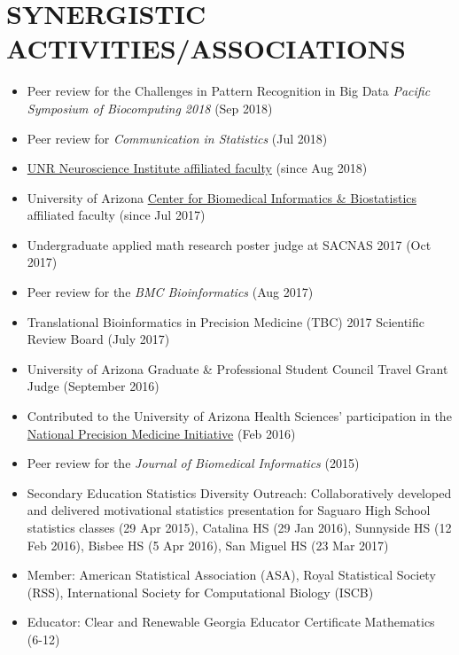 \documentclass[paper=a4,fontsize=11pt]{scrartcl} %
\newcommand{\NewPart}[2]{\section*{\uppercase{#1} #2 }}
\begin{document}
\NewPart{Synergistic Activities/Associations}{}
\vspace{-7pt}
\begin{itemize}[noitemsep]
  \item Peer review for the Challenges in Pattern Recognition in Big Data \emph{Pacific Symposium of Biocomputing 2018} (Sep 2018)
  \item Peer review for \emph{Communication in Statistics} (Jul 2018)
\item \href{https://www.unr.edu/neuroscience/people}{UNR Neuroscience Institute affiliated faculty} (since Aug 2018)
  \item University of Arizona \href{http://cb2.uahs.arizona.edu/}{Center for Biomedical Informatics \& Biostatistics} affiliated faculty (since Jul 2017)
\item Undergraduate applied math research poster judge at SACNAS 2017 (Oct 2017)
\item Peer review for the \emph{BMC Bioinformatics} (Aug 2017)
\item Translational Bioinformatics in Precision Medicine (TBC) 2017 Scientific Review Board (July 2017)
\item University of Arizona Graduate \& Professional Student Council Travel Grant Judge (September 2016)
\item Contributed to the University of Arizona Health Sciences' participation in the   \href{https://www.nih.gov/precision-medicine-initiative-cohort-program}{National Precision Medicine Initiative\circledR}  \hspace{3pt}(Feb 2016)
  \item Peer review for the \emph{Journal of Biomedical Informatics} (2015)
\item Secondary Education Statistics Diversity Outreach: Collaboratively developed and delivered motivational statistics presentation for Saguaro High School statistics classes (29 Apr 2015), Catalina HS (29 Jan 2016), Sunnyside HS (12 Feb 2016), Bisbee HS (5 Apr 2016), San Miguel HS (23 Mar 2017)
\item Member: American Statistical Association (ASA), Royal Statistical Society (RSS), International Society for Computational Biology (ISCB)
\item Educator: Clear and Renewable Georgia Educator Certificate Mathematics (6-12)
\vspace{-7pt}
\end{itemize}

\end{document}
